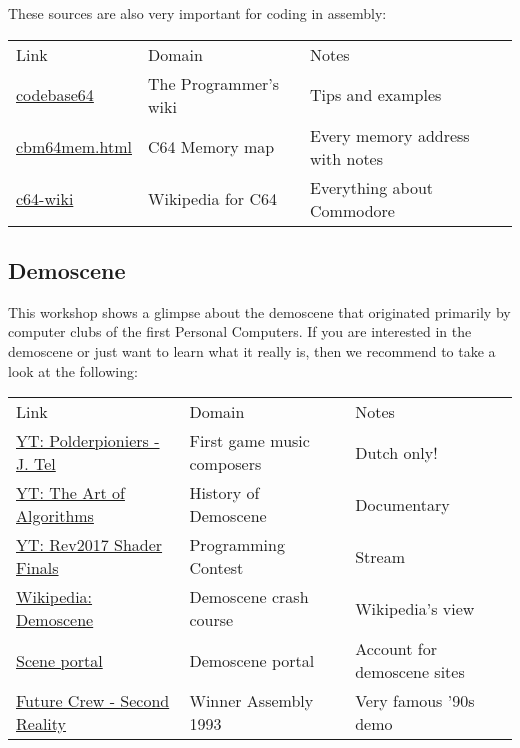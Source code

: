 \documentclass{article}
\begin{document}
These sources are also very important for coding in assembly:

\begin{tabular}{l|l|l}
Link & Domain & Notes \\
\href{http://codebase64.org}{codebase64} & The Programmer's wiki & Tips and examples \\
\href{http://sta.c64.org/cbm64mem.html}{cbm64mem.html} & C64 Memory map & Every memory address with notes \\
\href{https://www.c64-wiki.com}{c64-wiki} & Wikipedia for C64 & Everything about Commodore \\
\end{tabular}

\subsection{Demoscene}

This workshop shows a glimpse about the demoscene that originated primarily by computer clubs of the first Personal Computers.
If you are interested in the demoscene or just want to learn what it really is, then we recommend to take a look at the following:

\begin{tabular}{l|l|l}
Link & Domain & Notes \\
\href{https://www.youtube.com/watch?v=AdTANxS-LHg}{YT: Polderpioniers - J. Tel} & First game music composers & Dutch only! \\
\href{https://www.youtube.com/watch?v=5MexnBunH_g}{YT: The Art of Algorithms} & History of Demoscene & Documentary \\
\href{https://www.youtube.com/watch?v=O-1zEo7DD8w}{YT: Rev2017 Shader Finals} & Programming Contest & Stream \\
\href{https://en.wikipedia.org/wiki/Demoscene}{Wikipedia: Demoscene} & Demoscene crash course & Wikipedia's view \\
\href{https://id.scene.org/}{Scene portal} & Demoscene portal & Account for demoscene sites \\
\href{https://www.youtube.com/watch?v=rFv7mHTf0nA}{Future Crew - Second Reality} & Winner Assembly 1993 & Very famous '90s demo \\
\end{tabular}
\end{document}
